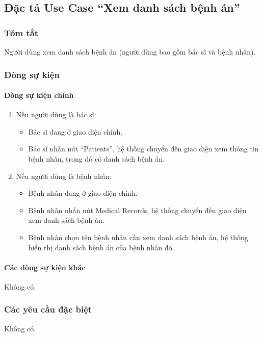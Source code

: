 \subsection{Đặc tả Use Case ``Xem danh sách bệnh án''}

\subsubsection{Tóm tắt}
Người dùng xem danh sách bệnh án (người dùng bao gồm bác sĩ và bệnh nhân).

\subsubsection{Dòng sự kiện}
\paragraph{\textbf{Dòng sự kiện chính}}
\begin{enumerate}
  \item Nếu người dùng là bác sĩ:
    \begin{itemize}
      \item Bác sĩ đang ở giao diện chính.
      \item Bác sĩ nhấn nút ``Patients'', hệ thống chuyển đến giao diện xem thông tin bệnh nhân, trong đó có danh sách bệnh án.
    \end{itemize}
  \item Nếu người dùng là bệnh nhân:
    \begin{itemize}
      \item Bệnh nhân đang ở giao diện chính.
      \item Bệnh nhân nhấn nút Medical Records, hệ thống chuyển đến giao diện xem danh sách bệnh án.
      \item Bệnh nhân chọn tên bệnh nhân cần xem danh sách bệnh án, hệ thống hiển thị danh sách bệnh án của bệnh nhân đó.
    \end{itemize}
\end{enumerate}

\paragraph{\textbf{Các dòng sự kiện khác}}
Không có.

\subsubsection{Các yêu cầu đặc biệt}
Không có.

